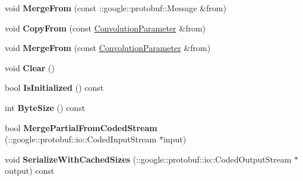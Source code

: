 \begin{DoxyCompactItemize}
\item 
\mbox{\label{classcaffe_1_1_convolution_parameter_ad94454ceb4b79f410b54f18a865a1a17}} 
void {\bfseries Merge\+From} (const \+::google\+::protobuf\+::\+Message \&from)
\item 
\mbox{\label{classcaffe_1_1_convolution_parameter_a4c1c8309cbd239315ae2f607ea2b8c8f}} 
void {\bfseries Copy\+From} (const \mbox{\hyperlink{classcaffe_1_1_convolution_parameter}{Convolution\+Parameter}} \&from)
\item 
\mbox{\label{classcaffe_1_1_convolution_parameter_ab93dd0429b1b287ff4420308e18f5761}} 
void {\bfseries Merge\+From} (const \mbox{\hyperlink{classcaffe_1_1_convolution_parameter}{Convolution\+Parameter}} \&from)
\item 
\mbox{\label{classcaffe_1_1_convolution_parameter_a2be5a07a7a7765783d0ef0447b8ea672}} 
void {\bfseries Clear} ()
\item 
\mbox{\label{classcaffe_1_1_convolution_parameter_ae1e63fee9863283c0006420ab8a86734}} 
bool {\bfseries Is\+Initialized} () const
\item 
\mbox{\label{classcaffe_1_1_convolution_parameter_ad4db7c8366a55240422fa72116fcb703}} 
int {\bfseries Byte\+Size} () const
\item 
\mbox{\label{classcaffe_1_1_convolution_parameter_a11f817f016abe9d9bd930c81ddd0668d}} 
bool {\bfseries Merge\+Partial\+From\+Coded\+Stream} (\+::google\+::protobuf\+::io\+::\+Coded\+Input\+Stream $\ast$input)
\item 
\mbox{\label{classcaffe_1_1_convolution_parameter_a4505b133cae59bc8a6ac25eb366fbf42}} 
void {\bfseries Serialize\+With\+Cached\+Sizes} (\+::google\+::protobuf\+::io\+::\+Coded\+Output\+Stream $\ast$output) const
\item 
\mbox{\label{classcaffe_1_1_convolution_parameter_a3702d6f8382874381ee0c3d977319f66}} 

\end{DoxyCompactItemize}
